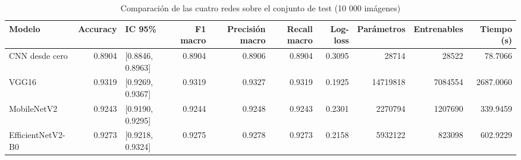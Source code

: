 \begin{table}
\caption{Comparación de las cuatro redes sobre el conjunto de test (10 000 imágenes)}
\label{tab:bono_comparativa}
\begin{tabular}{lrlrrrrrrr}
\toprule
Modelo & Accuracy & IC 95\% & F1 macro & Precisión macro & Recall macro & Log-loss & Parámetros & Entrenables & Tiempo (s) \\
\midrule
CNN desde cero & 0.8904 & [0.8846, 0.8963] & 0.8904 & 0.8906 & 0.8904 & 0.3095 & 28714 & 28522 & 78.7066 \\
VGG16 & 0.9319 & [0.9269, 0.9367] & 0.9319 & 0.9327 & 0.9319 & 0.1925 & 14719818 & 7084554 & 2687.0060 \\
MobileNetV2 & 0.9243 & [0.9190, 0.9295] & 0.9244 & 0.9248 & 0.9243 & 0.2301 & 2270794 & 1207690 & 339.9459 \\
EfficientNetV2-B0 & 0.9273 & [0.9218, 0.9324] & 0.9275 & 0.9278 & 0.9273 & 0.2158 & 5932122 & 823098 & 602.9229 \\
\bottomrule
\end{tabular}
\end{table}
